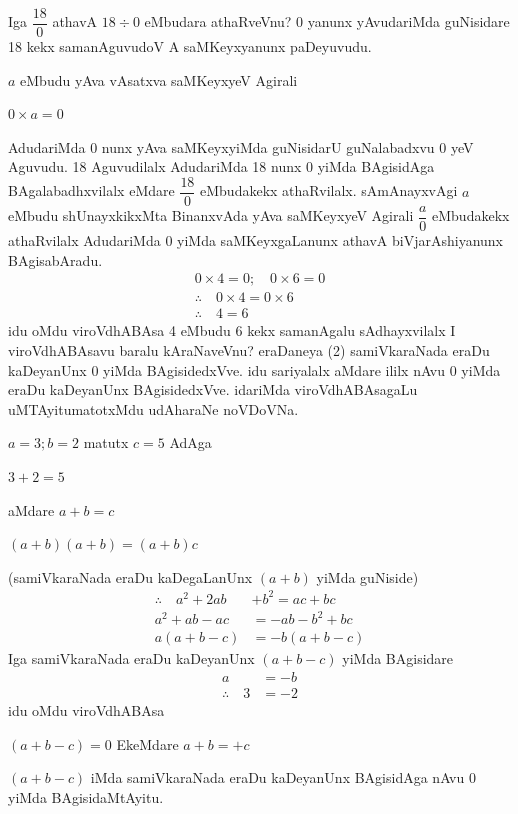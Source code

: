 Iga $\dfrac{18}{0}$ athavA $18\div 0$ eMbudara athaRveVnu? {\rm 0} yanunx yAvudariMda guNisidare {\rm 18} kekx samanAguvudoV A saMKeyxyanunx paDeyuvudu.

 $a$ eMbudu yAva vAsatxva saMKeyxyeV Agirali
\begin{center}
$0\times a=0$
\end{center}
AdudariMda {\rm 0} nunx yAva saMKeyxyiMda guNisidarU guNalabadxvu {\rm 0} yeV Aguvudu. {\rm 18} Aguvudilalx AdudariMda {\rm 18} nunx {\rm 0} yiMda BAgisidAga BAgalabadhxvilalx eMdare $\dfrac{18}{0}$ eMbudakekx athaRvilalx. sAmAnayxvAgi $a$ eMbudu shUnayxkikxMta BinanxvAda yAva saMKeyxyeV Agirali $\dfrac{a}{0}$ eMbudakekx athaRvilalx AdudariMda {\rm 0} yiMda  saMKeyxgaLanunx athavA biVjarAshiyanunx BAgisabAradu.
\begin{gather*}
0\times 4=0; \quad 0\times 6=0\tag{\rm 1}\\
\therefore \quad 0\times 4=0\times 6 \quad \tag{\rm 2}\\
\therefore \quad 4=6 \quad \tag{\rm 3}  
\end{gather*}
idu oMdu viroVdhABAsa {\rm 4} eMbudu {\rm 6} kekx samanAgalu sAdhayxvilalx\break 
I viroVdhABAsavu baralu kAraNaveVnu? eraDaneya {\rm (2)} samiVkaraNada eraDu kaDeyanUnx {\rm 0} yiMda BAgisidedxVve. idu sariyalalx aMdare ililx nAvu {\rm 0} yiMda eraDu kaDeyanUnx BAgisidedxVve. idariMda viroVdhABAsagaLu uMTAyitu\break matotxMdu udAharaNe noVDoVNa.
\begin{center}
$a=3 ; b=2$ \quad matutx \quad $c=5$ \quad AdAga

$3+2=5$

aMdare \quad $a+b=c$

$(a+b)(a+b)=(a+b)c$
\end{center}
(samiVkaraNada eraDu kaDegaLanUnx $(a+b)$ yiMda guNiside)
\begin{align*}
\therefore \quad a^2+2ab&+b^2=ac+bc\\
a^2+ab-ac&=-ab-b^2+bc\\
a(a+b-c)&=-b(a+b-c)
\end{align*}
Iga samiVkaraNada eraDu kaDeyanUnx $(a+b-c)$ yiMda BAgisidare
\begin{align*}
a&=-b\\
\therefore \quad 3&=-2
\end{align*}
idu oMdu viroVdhABAsa

$(a+b-c)=0$ \quad EkeMdare \quad $a+b=+c$

$(a+b-c)$ iMda samiVkaraNada eraDu kaDeyanUnx BAgisidAga nAvu {\rm 0} yiMda BAgisidaMtAyitu.

